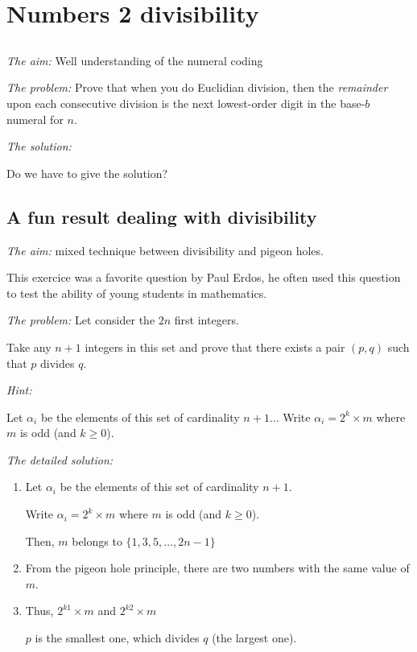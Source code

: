 \section{Numbers 2 divisibility}

\subsection{}

\noindent \textit{The aim:}
Well understanding of the numeral coding
\medskip

\noindent \textit{The problem:}
Prove that when you do Euclidian division, then the {\em remainder}
upon each consecutive division is the next lowest-order digit in the
base-$b$ numeral for $n$.
\medskip

\noindent \textit{The solution:}

Do we have to give the solution?


\subsection{A fun result dealing with divisibility}

\noindent \textit{The aim:}
mixed technique between divisibility and pigeon holes.

This exercice was a favorite question by Paul Erdos,
he often used this question to test the ability of young students in mathematics. 
\medskip

\noindent \textit{The problem:}
Let consider the $2n$ first integers.

Take any $n+1$ integers in this set and prove that there exists a pair $(p,q)$
such that $p$ divides $q$. 
\medskip

\noindent \textit{Hint:}

Let $\alpha_i$ be the elements of this set of cardinality $n+1$...
Write $\alpha_i = 2^k \times m$ where $m$ is odd (and $k \geq 0$).
\medskip

\noindent \textit{The detailed solution:}

\begin{enumerate}
\item
Let $\alpha_i$ be the elements of this set of cardinality $n+1$.

Write $\alpha_i = 2^k \times m$ where $m$ is odd (and $k \geq 0$).

Then, $m$ belongs to $\{1,3,5, \ldots, 2n-1 \}$
\item
From the pigeon hole principle, there are two numbers with the same value of $m$. 
\item 
Thus, $2^{k1} \times m$ and $2^{k2} \times m$

$p$ is the smallest one, which divides $q$ (the largest one).
\end{enumerate}


